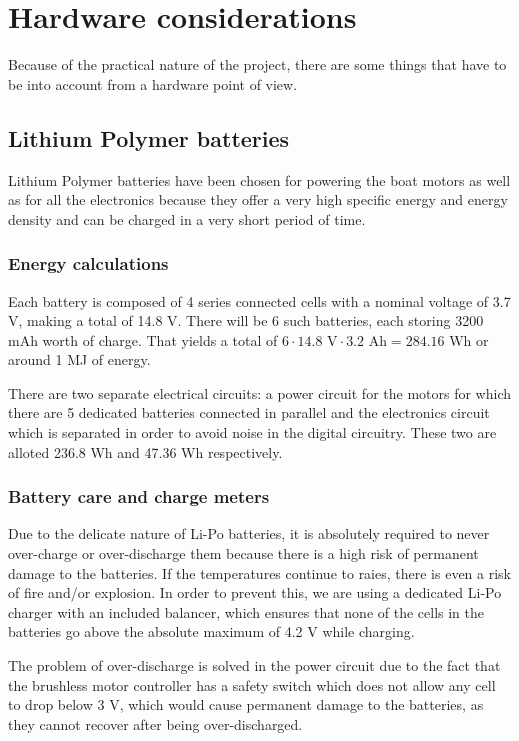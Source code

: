 \chapter{Hardware considerations}

Because of the practical nature of the project, there are some things that have to be into account from a hardware point of view.

\section{Lithium Polymer batteries}

	Lithium Polymer batteries have been chosen for powering the boat motors as well as for all the electronics because they offer a very high specific energy and energy density and can be charged in a very short period of time. 

	\subsection{Energy calculations}
	
	Each battery is composed of 4 series connected cells with a nominal voltage of 3.7 V, making a total of 14.8 V. There will be 6 such batteries, each storing 3200 mAh worth of charge. That yields a total of $ 6 \cdot 14.8 \text{ V} \cdot 3.2\text{ Ah} = 284.16 \text{ Wh} $ or around 1 MJ of energy.
	
	There are two separate electrical circuits: a power circuit for the motors for which there are 5 dedicated batteries connected in parallel and the electronics circuit which is separated in order to avoid noise in the digital circuitry. These two are alloted 236.8 Wh and 47.36 Wh respectively.
	
	\subsection{Battery care and charge meters}
	
	Due to the delicate nature of Li-Po batteries, it is absolutely required to never over-charge or over-discharge them because there is a high risk of permanent damage to the batteries. If the temperatures continue to raies, there is even a risk of fire and/or explosion. In order to prevent this, we are using a dedicated Li-Po charger with an included balancer, which ensures that none of the cells in the batteries go above the absolute maximum of 4.2 V while charging.
	
	The problem of over-discharge is solved in the power circuit due to the fact that the brushless motor controller has a safety switch which does not allow any cell to drop below 3 V, which would cause permanent damage to the batteries, as they cannot recover after being over-discharged. 
	

